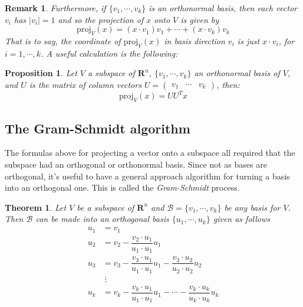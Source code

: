 \documentclass[12pt]{article}
\numberwithin{equation}{subsection}
\numberwithin{figure}{subsection}
\newtheorem{thm}[subsection]{Theorem}
\newtheorem{prop}[subsection]{Proposition}
\theoremstyle{note}
\newtheorem{remark}[subsection]{Remark}
\newcommand{\R}{\mathbf{R}}
\newcommand\m[1]{\begin{pmatrix}#1\end{pmatrix}}
\newcommand\proj[2]{\mathrm{proj}_{#1}(#2)}
\begin{document}
\begin{remark}Furthermore, if $\{v_1,\cdots,v_k\}$ is an ortho\textit{normal} basis, then each vector $v_i$ has $|v_i|=1$ and so %
the projection of $x$ onto $V$ is given by \begin{equation} 
		\proj{V}{x}=(x\cdot v_1)v_1+\cdots+(x\cdot v_k)v_k\end{equation}
That is to say, the coordinate of $\proj{V}{x}$ in basis direction $v_i$ is just $x\cdot v_i$, for $i=1,\cdots,k$. A useful calculation is the following:
\end{remark}
\begin{prop}
\label{prop-proj}
Let $V$ a subspace of $\R^n$, $\{v_1,\cdots,v_k\}$ an orthonormal basis of $V$, and $U$ is the matrix of column vectors $U=\m{v_1 & \cdots & v_k}$, then: \begin{equation}
		\proj{V}{x}=UU^Tx
	\end{equation}
\end{prop}

\subsection{The Gram-Schmidt algorithm}
The formulas above for projecting a vector onto a subspace all required that the subspace had an orthogonal or orthonormal basis. Since not as bases are orthogonal, it's useful to have a general approach algorithm for turning a basis into an orthogonal one. This is called the \textit{Gram-Schmidt} process.

\begin{thm}Let $V$ be a subspace of $\R^n$ and $\mathcal{B}=\{v_1,\cdots,v_k\}$ be \textit{any} basis for $V$. Then $\mathcal{B}$ can be made into an orthogonal basis $\{u_1,\cdots,u_k\}$ given as follows
\begin{align}
	u_1 &= v_1 \nonumber \\
	u_2 &= v_2- \dfrac{v_2\cdot u_1}{u_1\cdot u_1}u_1 \nonumber\\
	u_3 &= v_3 -\dfrac{v_3\cdot u_1}{u_1\cdot u_1}u_1-\dfrac{v_3\cdot u_2}{u_2\cdot u_2}u_2 \nonumber \\
	& \;\vdots \nonumber\\
	u_k &= v_k -  \dfrac{v_k\cdot u_1}{u_1\cdot u_1}u_1 - \cdots - \dfrac{v_k\cdot u_k}{u_k\cdot u_k}u_k 
\end{align}
\end{thm}
\end{document}
